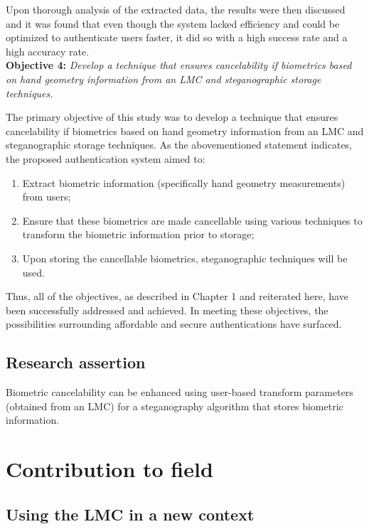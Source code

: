 Upon thorough analysis of the extracted data, the results were then discussed and it was found that even though the system lacked efficiency and could be optimized to authenticate users faster, it did so with a high success rate and a high accuracy rate.\\

\textbf{Objective 4:} \textit{Develop a technique that ensures cancelability if biometrics based on hand geometry information from an LMC and steganographic storage techniques.}

The primary objective of this study was to develop a technique that ensures cancelability if biometrics based on hand geometry information from an LMC and steganographic storage techniques. As the abovementioned statement indicates, the proposed authentication system aimed to:

\begin{enumerate}[label=\roman*.]
    \item Extract biometric information (specifically hand geometry measurements) from users;
    \item Ensure that these biometrics are made cancellable using various techniques to transform the biometric information prior to storage; 
    \item Upon storing the cancellable biometrics, steganographic techniques will be used.
\end{enumerate}

Thus, all of the objectives, as described in Chapter 1 and reiterated here, have been successfully addressed and achieved. In meeting these objectives, the possibilities surrounding affordable and secure authentications have surfaced. 


\subsection{Research assertion}

Biometric cancelability can be enhanced using user-based transform parameters (obtained from an LMC) for a steganography algorithm that stores biometric information.

\section{Contribution to field}

\subsection{Using the LMC in a new context}

